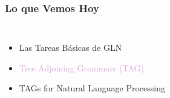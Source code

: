\documentclass[compress,color=usenames]{beamer}
\newcommand{\mH}[1]{\textcolor{Plum}{#1}}
\begin{document}

% 


% 

\begin{frame}
\frametitle{Lo que Vemos Hoy}

\begin{columns}
\begin{itemize}
\item Las Tareas B\'asicas de GLN
\item \mH{Tree Adjoining Grammars (TAG)}
\item TAGs for Natural Language Processing
\end{itemize}
\end{columns}
\end{frame}
\end{document}

